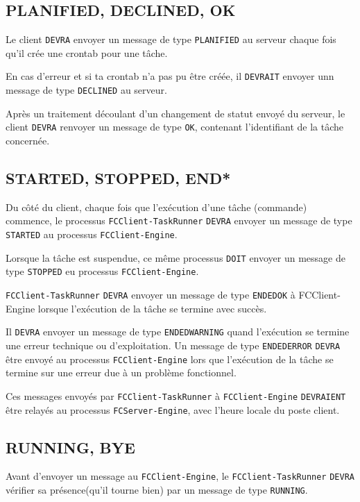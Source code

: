 \documentclass{bouygues-fr}
\begin{document}
\subsection{PLANIFIED, DECLINED, OK}
Le client \texttt{DEVRA} envoyer un message de type \texttt{PLANIFIED} au serveur chaque fois qu'il crée une crontab pour une tâche.

En cas d'erreur et si ta crontab n'a pas pu être créée, il \texttt{DEVRAIT} envoyer unn message de type \texttt{DECLINED} au serveur.

Après un traitement découlant d'un changement de statut envoyé du serveur, le client \texttt{DEVRA} renvoyer un message de type \texttt{OK}, contenant l'identifiant de la tâche concernée.

\subsection{STARTED, STOPPED, END*}
Du côté du client, chaque fois que l'exécution d'une tâche (commande) commence, le processus \texttt{FCClient-TaskRunner} \texttt{DEVRA} envoyer un message de type \texttt{STARTED} au processus \texttt{FCClient-Engine}.

Lorsque la tâche est suspendue, ce même processus \texttt{DOIT} envoyer un message de type \texttt{STOPPED} eu processus \texttt{FCClient-Engine}.

\texttt{FCClient-TaskRunner} \texttt{DEVRA} envoyer un message de type \texttt{ENDEDOK} à FCClient-Engine lorsque l'exécution de la tâche se termine avec succès. 

Il \texttt{DEVRA} envoyer un message de type \texttt{ENDEDWARNING} quand l'exécution se termine une erreur technique ou d'exploitation. Un message de type \texttt{ENDEDERROR} \texttt{DEVRA} être envoyé au processus \texttt{FCClient-Engine} lors que l'exécution de la tâche se termine sur une erreur due à un problème fonctionnel.

Ces messages envoyés par \texttt{FCClient-TaskRunner} à \texttt{FCClient-Engine} \texttt{DEVRAIENT} être relayés au processus \texttt{FCServer-Engine}, avec l'heure locale du poste client.

\subsection{RUNNING, BYE}
Avant d'envoyer un message au \texttt{FCClient-Engine}, le \texttt{FCClient-TaskRunner} \texttt{DEVRA} vérifier sa présence(qu'il tourne bien) par un message de type \texttt{RUNNING}.
\end{document}

